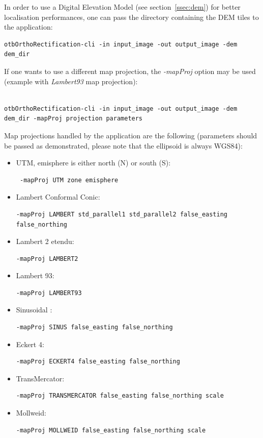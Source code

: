 In order to use a Digital Elevation Model (see section~\ref{ssec:dem})
for better localisation performances, one can pass the directory
containing the DEM tiles to the application:

\begin{verbatim}
otbOrthoRectification-cli -in input_image -out output_image -dem dem_dir
\end{verbatim}

If one wants to use a different map projection, the \emph{-mapProj}
option may be used (example with \emph{Lambert93} map projection):

\begin{verbatim}

otbOrthoRectification-cli -in input_image -out output_image -dem
dem_dir -mapProj projection parameters

\end{verbatim}

Map projections handled by the application are the following
(parameters should be passed as demonstrated, please note that the
ellipsoid is always WGS84):
\begin{itemize}
\item UTM, emisphere is either north (N) or south (S): \begin{verbatim} -mapProj UTM zone emisphere \end{verbatim}
\item Lambert Conformal Conic: \begin{verbatim}-mapProj LAMBERT std_parallel1 std_parallel2 false_easting false_northing \end{verbatim}
\item Lambert 2 etendu: \begin{verbatim}-mapProj LAMBERT2 \end{verbatim}
\item Lambert 93: \begin{verbatim}-mapProj LAMBERT93 \end{verbatim}
\item Sinusoidal : \begin{verbatim}-mapProj SINUS false_easting false_northing \end{verbatim}
\item Eckert 4: \begin{verbatim}-mapProj ECKERT4 false_easting false_northing\end{verbatim}
\item TransMercator: \begin{verbatim}-mapProj TRANSMERCATOR false_easting false_northing scale \end{verbatim}
\item Mollweid: \begin{verbatim}-mapProj MOLLWEID false_easting false_northing scale \end{verbatim}
\end{itemize}

